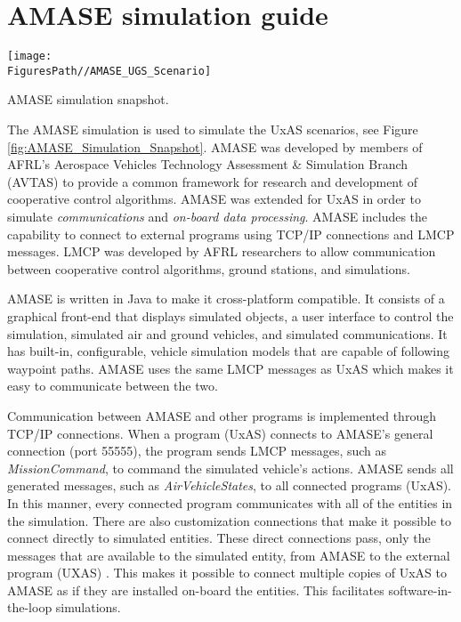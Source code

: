 \section{AMASE simulation guide}

\begin{marginfigure}[150pt]
	\texttt{[image: \\FiguresPath//AMASE\_UGS\_Scenario]}
	\caption{AMASE simulation snapshot.}
	\label{fig:AMASE_Simulation_Snapshot}
\end{marginfigure}


The AMASE simulation is used to simulate the UxAS scenarios, see Figure \ref{fig:AMASE_Simulation_Snapshot}. AMASE was developed by members of AFRL's Aerospace Vehicles Technology Assessment \& Simulation Branch (AVTAS) to provide a common framework for research and development of cooperative control algorithms. AMASE was extended for UxAS in order to simulate \emph{communications} and \emph{on-board data processing}. AMASE includes the capability to connect to external programs using TCP/IP connections and LMCP messages. LMCP was developed by AFRL researchers to allow communication between cooperative control algorithms, ground stations, and simulations.

AMASE is written in Java to make it cross-platform compatible. It consists of a graphical front-end that displays simulated objects, a user interface to control the simulation, simulated air and ground vehicles,   and simulated communications. It has built-in, configurable, vehicle simulation models that are capable of following waypoint paths. AMASE uses the same LMCP messages as UxAS which makes it easy to communicate between the two. 

Communication between AMASE and other programs is implemented through TCP/IP connections. When a program (UxAS) connects to AMASE's general connection (port 55555), the program sends LMCP messages, such as \textit{MissionCommand}, to command the simulated vehicle's actions. AMASE sends all generated messages, such as \textit{AirVehicleStates}, to all connected programs (UxAS). In this manner, every connected program communicates with all of the entities in the simulation. There are also customization connections that make it possible to connect directly to simulated entities. These direct connections pass, only the messages that are available to the simulated entity, from AMASE to the external program (UXAS) . This makes it possible to connect multiple copies of UxAS to AMASE as if they are installed on-board the entities. This facilitates software-in-the-loop simulations.

